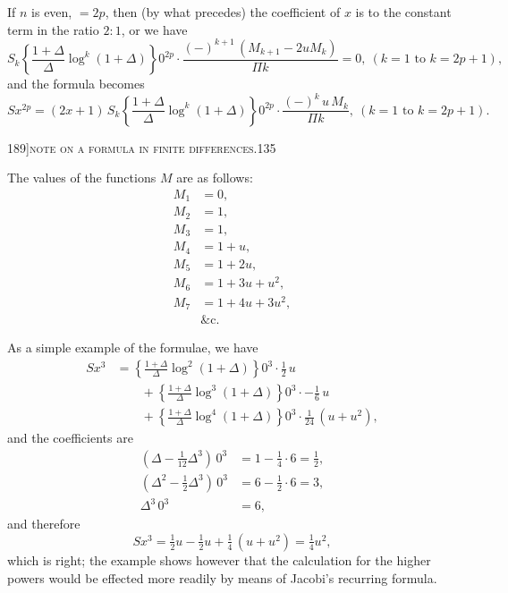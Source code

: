 \documentclass[11pt]{article}
\begin{document}
If $n$ is even, $= 2p$, then (by what precedes) the coefficient of $x$ is to the constant term in the ratio $2 : 1$, or we have
\[
S_{k}\left\{\frac{1+\Delta}{\Delta}\log^{k}(1+\Delta)\right\}0^{2p}\cdot\frac{(-)^{k+1}\,(M_{k+1} - 2 u M_{k})}{\Pi k} = 0,\ (k = 1 \text{ to } k = 2p + 1),
\]
and the formula becomes
\[
Sx^{2p} = (2x+1)\,S_{k}\left\{\frac{1+\Delta}{\Delta}\log^{k}(1+\Delta)\right\}0^{2p}\cdot\frac{(-)^{k}\,u\,M_{k}}{\Pi k},\ (k = 1 \text{ to } k = 2p + 1).
\]

\newpage

\begin{center}
\small 189]\hfill\textsc{note on a formula in finite differences.}\hfill\textsc{135}
\end{center}

\medskip

\noindent The values of the functions $M$ are as follows:
\begin{align*}
M_{1} &= 0, \\
M_{2} &= 1, \\
M_{3} &= 1, \\
M_{4} &= 1 + u, \\
M_{5} &= 1 + 2u, \\
M_{6} &= 1 + 3u + u^{2}, \\
M_{7} &= 1 + 4u + 3u^{2}, \\
&\&\text{c.}
\end{align*}

As a simple example of the formulae, we have
\begin{align*}
Sx^{3} &= \left\{\frac{1+\Delta}{\Delta}\log^{2}(1+\Delta)\right\}0^{3}\cdot\tfrac{1}{2}\,u \\
&\hspace{2em} + \left\{\frac{1+\Delta}{\Delta}\log^{3}(1+\Delta)\right\}0^{3}\cdot -\tfrac{1}{6}\,u \\
&\hspace{2em} + \left\{\frac{1+\Delta}{\Delta}\log^{4}(1+\Delta)\right\}0^{3}\cdot\tfrac{1}{24}\,(u + u^{2}),
\end{align*}
and the coefficients are
\begin{align*}
(\Delta - \tfrac{1}{12}\Delta^{3})\,0^{3} &= 1 - \tfrac{1}{4}\cdot 6 = \tfrac{1}{2}, \\
(\Delta^{2} - \tfrac{1}{2}\Delta^{3})\,0^{3} &= 6 - \tfrac{1}{2}\cdot 6 = 3, \\
\Delta^{3}\,0^{3} &= 6,
\end{align*}
and therefore
\[
Sx^{3} = \tfrac{1}{2} u - \tfrac{1}{2} u + \tfrac{1}{4}\,(u + u^{2}) = \tfrac{1}{4} u^{2},
\]
which is right; the example shows however that the calculation for the higher powers would be effected more readily by means of Jacobi's recurring formula.
\end{document}
